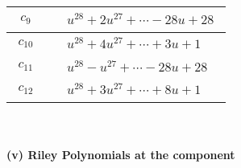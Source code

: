 \documentclass[1p]{elsarticle_modified}
\theoremstyle{definition}
\begin{document}
\begin{tabular}{m{50pt}|m{274pt}}
\hline $$\begin{aligned}c_{9}\end{aligned}$$&$\begin{aligned}
&u^{28}+2 u^{27}+\cdots-28 u+28
\end{aligned}$\\
\hline $$\begin{aligned}c_{10}\end{aligned}$$&$\begin{aligned}
&u^{28}+4 u^{27}+\cdots+3 u+1
\end{aligned}$\\
\hline $$\begin{aligned}c_{11}\end{aligned}$$&$\begin{aligned}
&u^{28}- u^{27}+\cdots-28 u+28
\end{aligned}$\\
\hline $$\begin{aligned}c_{12}\end{aligned}$$&$\begin{aligned}
&u^{28}+3 u^{27}+\cdots+8 u+1
\end{aligned}$\\
\hline
\end{tabular}\\~\\
\newpage\renewcommand{\arraystretch}{1}
\flushleft \textbf{(v) Riley Polynomials at the component}\newline \\
\end{document}
